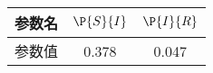 \begin{tabular}{ccc}
\hline
参数名&$\P{S}{I}$&$\P{I}{R}$\\
\hline
参数值&0.378&0.047\\
\hline
\end{tabular}